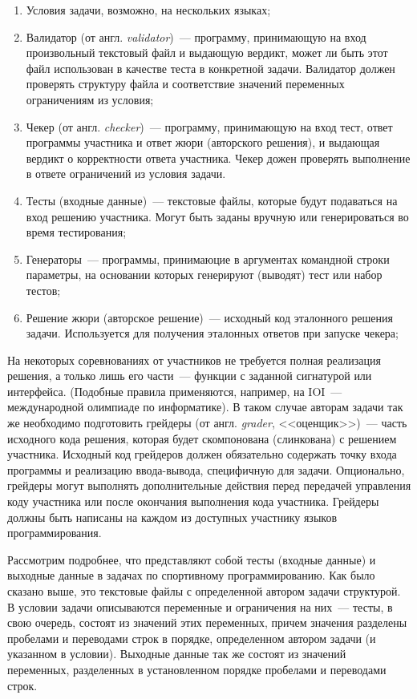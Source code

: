 \documentclass[times,specification,annotation]{style/itmo-student-thesis/itmo-student-thesis}
\begin{document}
\begin{enumerate}
    \item Условия задачи, возможно, на нескольких языках;
    \item Валидатор (от англ. \textit{validator})~--- программу, принимающую на вход произвольный текстовый файл и выдающую вердикт, может ли быть этот файл использован в качестве теста в конкретной задачи. Валидатор должен проверять структуру файла и соответствие значений переменных ограничениям из условия;
    \item Чекер (от англ. \textit{checker})~--- программу, принимающую на вход тест, ответ программы участника и ответ жюри (авторского решения), и выдающая вердикт о корректности ответа участника. Чекер дожен проверять выполнение в ответе ограничений из условия задачи.
    \item Тесты (входные данные)~--- текстовые файлы, которые будут подаваться на вход решению участника. Могут быть заданы вручную или генерироваться во время тестирования;
    \item Генераторы~--- программы, принимаюцие в аргументах командной строки параметры, на основании которых генерируют (выводят) тест или набор тестов;
    \item Решение жюри (авторское решение)~--- исходный код эталонного решения задачи. Используется для получения эталонных ответов при запуске чекера;
\end{enumerate}

На некоторых соревнованиях от участников не требуется полная реализация решения, а только лишь его части~--- функции с заданной сигнатурой или интерфейса. (Подобные правила применяются, например, на IOI~--- международной олимпиаде по информатике). В таком случае авторам задачи так же необходимо подготовить грейдеры (от англ. \textit{grader}, <<оценщик>>)~--- часть исходного кода решения, которая будет скомпонована (слинкована) с решением участника. Исходный код грейдеров должен обязательно содержать точку входа программы и реализацию ввода-вывода, специфичную для задачи. Опционально, грейдеры могут выполнять дополнительные действия перед передачей управления коду участника или после окончания выполнения кода участника. Грейдеры должны быть написаны на каждом из доступных участнику языков программирования.

Рассмотрим подробнее, что представляют собой тесты (входные данные) и выходные данные в задачах по спортивному программированию. Как было сказано выше, это текстовые файлы с определенной автором задачи структурой. В условии задачи описываются переменные и ограничения на них~--- тесты, в свою очередь, состоят из значений этих переменных, причем значения разделены пробелами и переводами строк в порядке, определенном автором задачи (и указанном в условии). Выходные данные так же состоят из значений переменных, разделенных в установленном порядке пробелами и переводами строк.
\end{document}
